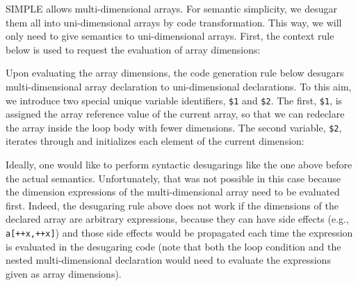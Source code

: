 \documentclass{article}
\begin{document}
\begin{kdefinition}
\begin{module}{}
\begin{kblock}[text]
 SIMPLE allows multi-dimensional arrays.  For semantic simplicity, we
desugar them all into uni-dimensional arrays by code transformation.
This way, we will only need to give semantics to uni-dimensional arrays.
First, the context rule below is used to request the evaluation of array
dimensions: \end{kblock}
\begin{kblock}[text]
  Upon evaluating the array dimensions, the code generation rule below
desugars multi-dimensional array declaration to uni-dimensional declarations.
To this aim, we introduce two special unique variable identifiers,
\texttt{\$1} and \texttt{\$2}.  The first, \texttt{\$1}, is assigned the array
reference value of the current array, so that we can redeclare the array
inside the loop body with fewer dimensions.  The second variable,
\texttt{\$2}, iterates through and initializes each element of the current
dimension: \end{kblock}

\begin{syntaxBlock}{}
\end{syntaxBlock}
\begin{kblock}[text]
 Ideally, one would like to perform syntactic desugarings like the one
above before the actual semantics.  Unfortunately, that was not possible in
this case because the dimension expressions of the multi-dimensional array need
to be evaluated first.  Indeed, the desugaring rule above does not work if the
dimensions of the declared array are arbitrary expressions, because they can
have side effects (e.g., \texttt{a[++x,++x]}) and those side effects would be
propagated each time the expression is evaluated in the desugaring code (note
that both the loop condition and the nested multi-dimensional declaration
would need to evaluate the expressions given as array dimensions). \end{kblock}
\begin{kblock}[text]

\end{kblock}
\end{module}
\end{kdefinition}
\end{document}
